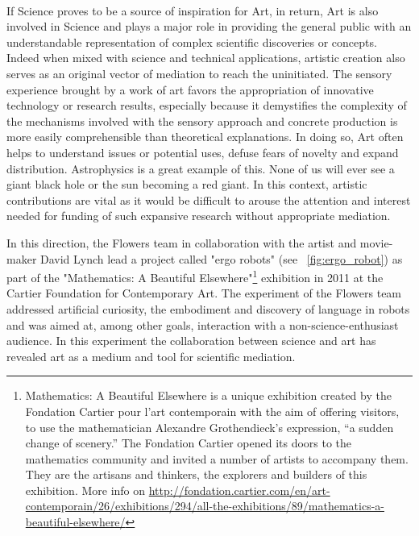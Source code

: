 \begin{figure}[!tb]
\centering
    \\
    \hfil
    \caption{}
    \label{fig:chronophotography_history}
\end{figure}


If Science proves to be a source of inspiration for Art, in return, Art is also involved in Science and plays a major role in providing the general public with an understandable representation of complex scientific discoveries or concepts. Indeed when mixed with science and technical applications, artistic creation also serves as an original vector of mediation to reach the uninitiated. The sensory experience brought by a work of art favors the appropriation of innovative technology or research results, especially because it demystifies the complexity of the mechanisms involved with the sensory approach and concrete production is more easily comprehensible than theoretical explanations. In doing so, Art often helps to understand issues or potential uses, defuse fears of novelty and expand distribution.
Astrophysics is a great example of this. None of us will ever see a giant black hole or the sun becoming a red giant. In this context, artistic contributions are vital as it would be difficult to arouse the attention and interest needed for funding of such expansive research without appropriate mediation.


In this direction, the Flowers team in collaboration with the artist and movie-maker David Lynch lead a project called "ergo robots" (see \figurename~\ref{fig:ergo_robot}) as part of the "Mathematics: A Beautiful Elsewhere"\footnote{Mathematics: A Beautiful Elsewhere is a unique exhibition created by the Fondation Cartier pour l’art contemporain with the aim of offering visitors, to use the mathematician Alexandre Grothendieck’s expression, “a sudden change of scenery.” The Fondation Cartier opened its doors to the mathematics community and invited a number of artists to accompany them. They are the artisans and thinkers, the explorers and builders of this exhibition. More info on \url{http://fondation.cartier.com/en/art-contemporain/26/exhibitions/294/all-the-exhibitions/89/mathematics-a-beautiful-elsewhere/}} exhibition in 2011 at the Cartier Foundation for Contemporary Art. The experiment of the Flowers team addressed artificial curiosity, the embodiment and discovery of language in robots and was aimed at, among other goals, interaction with a non-science-enthusiast audience. In this experiment the collaboration between science and art has revealed art as a medium and tool for scientific mediation.

